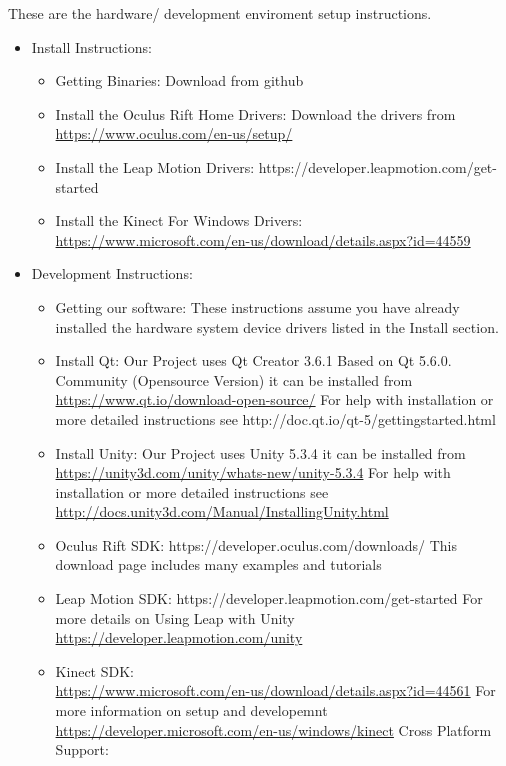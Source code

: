 \documentclass[a4paper,10pt]{article}
\begin{document}
These are the hardware/ development enviroment setup instructions. 
\begin{itemize}
 \item Install Instructions:
 \begin{itemize}
 \item  Getting Binaries: Download from github
  \item Install the Oculus Rift Home Drivers: Download the drivers from~\\ \url{https://www.oculus.com/en-us/setup/}
  \item Install the Leap Motion Drivers: https://developer.leapmotion.com/get-started
  \item Install the Kinect For Windows Drivers: ~\\\url{https://www.microsoft.com/en-us/download/details.aspx?id=44559}
 \end{itemize}
 \item Development Instructions:
  \begin{itemize}
   \item Getting our software: These instructions assume you have already installed the hardware system device drivers 
listed in the Install section.
\item Install Qt:
Our Project uses Qt Creator 3.6.1 Based on Qt 5.6.0. Community (Opensource Version) 
it can be installed from ~\\\url{https://www.qt.io/download-open-source/}
For help with installation or more detailed instructions see
http://doc.qt.io/qt-5/gettingstarted.html 
\item Install Unity:
Our Project uses Unity 5.3.4 
it can be installed from 
~\\\url{https://unity3d.com/unity/whats-new/unity-5.3.4}
For help with installation or more detailed instructions see
~\\\url{http://docs.unity3d.com/Manual/InstallingUnity.html}
\item Oculus Rift SDK:
https://developer.oculus.com/downloads/
This download page includes many examples and tutorials
\item Leap Motion SDK:
https://developer.leapmotion.com/get-started
For more details on Using Leap with Unity ~\\\url{https://developer.leapmotion.com/unity} 
\item Kinect SDK:
~\\\url{https://www.microsoft.com/en-us/download/details.aspx?id=44561}
For more information on setup and developemnt  ~\\\url{https://developer.microsoft.com/en-us/windows/kinect}
Cross Platform Support:


\end{itemize}
\end{itemize}
\end{document}
